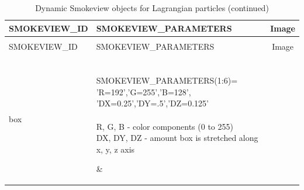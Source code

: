 \begin{longtable}[ht]{|l|l|c|}
\caption{Dynamic Smokeview objects for Lagrangian particles}
\label{tab:devices_dynamic2}
\\ \hline
{\ct SMOKEVIEW\_ID}  & {\ct SMOKEVIEW\_PARAMETERS} & Image  \\ \hline \hline
\endfirsthead
\caption{Dynamic Smokeview objects for Lagrangian particles (continued)}
\\ \hline
{\ct SMOKEVIEW\_ID}  & {\ct SMOKEVIEW\_PARAMETERS} & Image  \\ \hline \hline
\endhead

{\ct box} &
\parbox[c]{\boxwidth}{
\hspace{1in} \\
{\ct SMOKEVIEW\_PARAMETERS(1:6)=}\\
{\ct 'R=192','G=255','B=128',}\\
{\ct 'DX=0.25','DY=.5','DZ=0.125'}\\  \\
R, G, B - color components (0 to 255) \\
DX, DY, DZ - amount box is stretched along x, y, z axis \\
\hspace{1in}
} &
 \\ \hline

{\ct tube} &
\parbox[c]{\boxwidth}{
\hspace{1in} \\
{\ct SMOKEVIEW\_PARAMETERS(1:5)=}\\
{\ct 'R=255','G=0','B=0',}\\
{\ct 'D=0.2','L=0.6'}\\ \\
R, G, B - color components (0 to 255) \\
D, L - diameter and length (m) \\
\hspace{1in}
} &
 \\ \hline

{\ct velegg} &
\parbox[c]{\boxwidth}{
\hspace{1in} \\
{\ct SMOKEVIEW\_PARAMETERS(1:9)=} \\
{\ct 'R=0', 'G=0', 'B=0'} \\
{\ct 'U-VEL=1.', 'V-VEL=1.', 'W-VEL=1.'}  \\
{\ct 'VELMIN=0.01', 'VELMAX=0.2', 'D=1.0'} \\  \\
R, G, B - color components (0 to 255) \\
U-VEL, V-VEL, W-VEL - velocity components (m/s) \\
VELMIN, VELMAX - minimum and maximum velocity\\
D - diameter of egg at maximum velocity (m) \\
\hspace{1in}
} &
 \\ \hline


\end{longtable}
